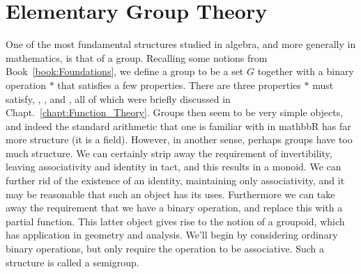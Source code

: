 \begingroup
    \ifcsname\PATH\endcsname
        \newcommand{\PATH}{books/Algebra/Group_Theory}
        \newcommand{\OLDPATH}{\PATH}
    \else
        \newcommand{\OLDPATH}{\PATH}
        \renewcommand{\PATH}{books/Algebra/Group_Theory}
    \fi
    \chapter{Elementary Group Theory}
        One of the most fundamental structures studied in algebra, and more
        generally in mathematics, is that of a \gls{group}.
        Recalling some notions from Book~\ref{book:Foundations}, we define a
        group to be a \gls{set} $G$ together with a
        \gls{binary operation} $*$ that satisfies a few
        properties. There are three properties $*$ must satisfy,
        ,
        , and
        ,
        all of which were briefly discussed in
        Chapt.~\ref{chapt:Function_Theory}. Groups then seem to be very simple
        objects, and indeed the standard arithmetic that one is
        familiar with in \gls{mathbbR} has far more structure (it is a
        \gls{field}). However, in another sense, perhaps groups
        have too much structure. We can certainly strip away the requirement of
        invertibility, leaving associativity and identity in tact, and this
        results in a \gls{monoid}. We can further rid of the
        existence of an identity, maintaining only associativity, and it may be
        reasonable that such an object has its uses. Furthermore we can take
        away the requirement that we have a binary operation, and replace this
        with a partial function. This latter object
        gives rise to the notion of a groupoid, which has
        application in geometry and analysis. We'll begin by considering
        ordinary binary operations, but only require the operation to be
        associative. Such a structure is called a
        \gls{semigroup}.
        
        
        
        
